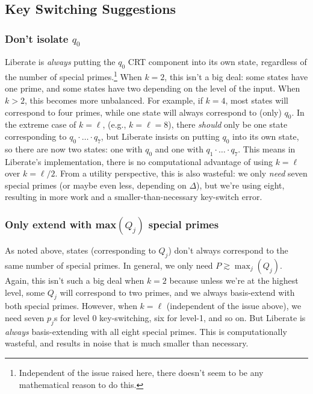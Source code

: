 \documentclass[../../fheimpl.tex]{subfiles}
\begin{document}
\subsection{Key Switching Suggestions}
\label{sec:liberatesuggestsion}
\subsubsection{Don't isolate $q_0$}
Liberate is \emph{always} putting the $q_0$ CRT component into its own state, regardless of the number of special primes.\footnote{Independent of the issue raised here, there doesn't seem to be any mathematical reason to do this.} When $k=2$, this isn't a big deal: some states have one prime, and some states have two depending on the level of the input. When $k>2$, this becomes more unbalanced. For example, if $k=4$, most states will correspond to four primes, while one state will always correspond to (only) $q_0$. In the extreme case of $k=\ell$, (e.g., $k=\ell=8$), there \emph{should} only be one state corresponding to $q_0\cdot\ldots\cdot q_7$, but Liberate insists on putting $q_0$ into its own state, so there are now two states: one with $q_0$ and one with $q_1\cdot\ldots\cdot q_7$. This means in Liberate's implementation, there is no computational advantage of using $k=\ell$ over $k=\ell/2$. From a utility perspective, this is also wasteful: we only \emph{need} seven special primes (or maybe even less, depending on $\Delta$), but we're using eight, resulting in more work and a smaller-than-necessary key-switch error.

\subsubsection{Only extend with max$(Q_j)$ special primes}
As noted above, states (corresponding to $Q_j$) don't always correspond to the same number of special primes. In general, we only need $P\gtrsim \max_j(Q_j)$. Again, this isn't such a big deal when $k=2$ because unless we're at the highest level, some $Q_j$ will correspond to two primes, and we always basis-extend with both special primes. However, when $k=\ell$ (independent of the issue above), we need seven $p_j$s for level 0 key-switching, six for level-1, and so on. But Liberate is \emph{always} basis-extending with all eight special primes. This is computationally wasteful, and results in noise that is much smaller than necessary.

\ifcompileasbook
\else
\printbibliography
\fi
\end{document}
